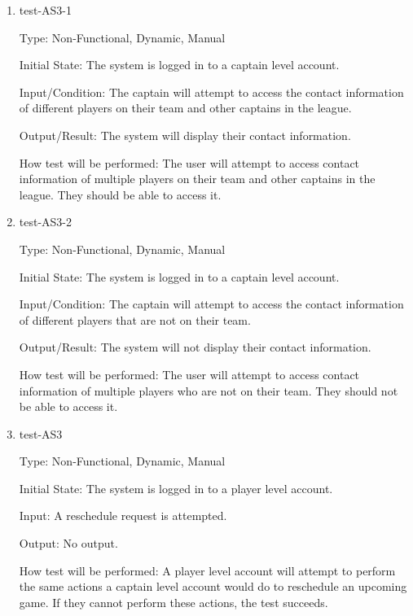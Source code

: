 \documentclass[12pt, titlepage]{article}
\begin{document}
\begin{enumerate}

  \item{test-AS3-1\\}
  
  Type: Non-Functional, Dynamic, Manual
            
  Initial State: The system is logged in to a captain level account.
            
  Input/Condition: The captain will attempt to access the contact information
  of different players on their team and other captains in the league.
            
  Output/Result: The system will display their contact information.
            
  How test will be performed: The user will attempt to access contact
  information of multiple players on their team and other captains in the
  league. They should be able to access it.

  \item{test-AS3-2\\}
  
  Type: Non-Functional, Dynamic, Manual
            
  Initial State: The system is logged in to a captain level account.
            
  Input/Condition: The captain will attempt to access the contact information
  of different players that are not on their team.
            
  Output/Result: The system will not display their contact information.
            
  How test will be performed: The user will attempt to access contact
  information of multiple players who are not on their team. They should not
  be able to access it.

  \item{test-AS3\\}

  Type: Non-Functional, Dynamic, Manual

  Initial State: The system is logged in to a player level account.

  Input: A reschedule request is attempted.

  Output: No output.

  How test will be performed: A player level account will attempt to perform
  the same actions a captain level account would do to reschedule an upcoming
  game. If they cannot perform these actions, the test succeeds.


\end{enumerate}
\end{document}
